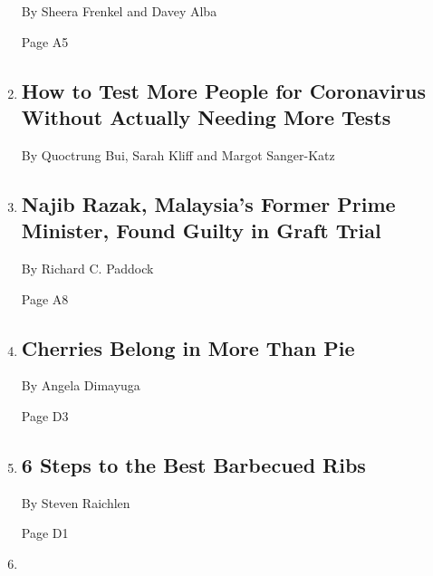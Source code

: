 \begin{enumerate}
  By Sheera Frenkel and Davey Alba

  Page A5
\item
  \href{/interactive/2020/07/27/upshot/coronavirus-pooled-testing.html}{}

  \hypertarget{how-to-test-more-people-for-coronavirus-without-actually-needing-more-tests}{%
  \subsection{How to Test More People for Coronavirus Without Actually
  Needing More
  Tests}\label{how-to-test-more-people-for-coronavirus-without-actually-needing-more-tests}}

  By Quoctrung Bui, Sarah Kliff and Margot Sanger-Katz
\item
  \href{/2020/07/28/world/asia/malaysia-1mdb-najib.html}{}

  \hypertarget{najib-razak-malaysias-former-prime-minister-found-guilty-in-graft-trial}{%
  \subsection{Najib Razak, Malaysia's Former Prime Minister, Found
  Guilty in Graft
  Trial}\label{najib-razak-malaysias-former-prime-minister-found-guilty-in-graft-trial}}

  By Richard C. Paddock

  Page A8
\item
  \href{/2020/07/24/dining/cherry-salad-recipe.html}{}

  \hypertarget{cherries-belong-in-more-than-pie}{%
  \subsection{Cherries Belong in More Than
  Pie}\label{cherries-belong-in-more-than-pie}}

  By Angela Dimayuga

  Page D3
\item
  \href{/2020/07/24/dining/bbq-ribs-recipe.html}{}

  \hypertarget{6-steps-to-the-best-barbecued-ribs}{%
  \subsection{6 Steps to the Best Barbecued
  Ribs}\label{6-steps-to-the-best-barbecued-ribs}}

  By Steven Raichlen

  Page D1
\item
  \href{/2020/07/28/technology/amazon-apple-facebook-google-antitrust-hearing.html}{}


\end{enumerate}
